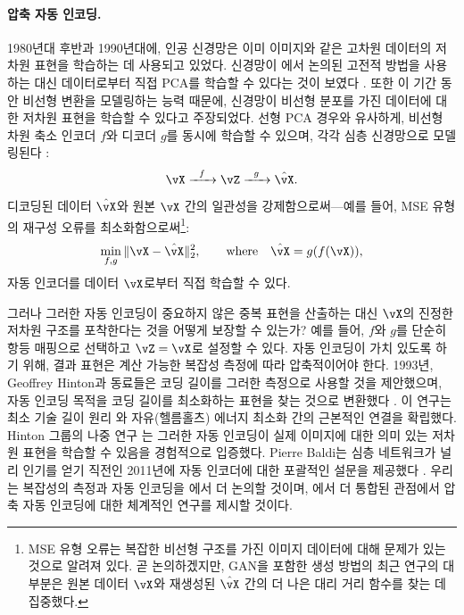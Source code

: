 \documentclass[../../book-main_ko.tex]{subfiles}
\begin{document}
\paragraph{압축 자동 인코딩.}
1980년대 후반과 1990년대에, 인공 신경망은 이미 이미지와 같은 고차원 데이터의 저차원 표현을 학습하는 데 사용되고 있었다. 신경망이 에서 논의된 고전적 방법을 사용하는 대신 데이터로부터 직접 PCA를 학습할 수 있다는 것이 보였다 \cite{Oja1982SimplifiedNM,Baldi89}. 또한 이 기간 동안 비선형 변환을 모델링하는 능력 때문에, 신경망이 비선형 분포를 가진 데이터에 대한 저차원 표현을 학습할 수 있다고 주장되었다. 선형 PCA 경우와 유사하게, 비선형 차원 축소 인코더 \(f\)와 디코더 \(g\)를 동시에 학습할 수 있으며, 각각 심층 신경망으로 모델링된다 \cite{Rumelhart1986,Kramer1991NonlinearPC}:
\begin{equation}
    \vX   \xrightarrow{\hspace{2mm} f \hspace{2mm}} \vZ  \xrightarrow{\hspace{2mm} g \hspace{2mm}} \hat{\vX}.
       \label{eqn:auto-encoding-deep-networks}
\end{equation}
디코딩된 데이터 \(\hat{\vX}\)와 원본 \(\vX\) 간의 일관성을 강제함으로써---예를 들어, MSE 유형의 재구성 오류를 최소화함으로써\footnote{MSE 유형 오류는 복잡한 비선형 구조를 가진 이미지 데이터에 대해 문제가 있는 것으로 알려져 있다. 곧 논의하겠지만, GAN을 포함한 생성 방법의 최근 연구의 대부분은 원본 데이터 \(\vX\)와 재생성된 \(\hat{\vX}\) 간의 더 나은 대리 거리 함수를 찾는 데 집중했다.}:
\begin{equation}
    \min_{f,g} \|\vX - \hat{\vX}\|_{2}^{2}, \qquad \text{where} \quad \hat{\vX} = g(f(\vX)),
\end{equation}
자동 인코더를 데이터 \(\vX\)로부터 직접 학습할 수 있다.

그러나 그러한 자동 인코딩이 중요하지 않은 중복 표현을 산출하는 대신 \(\vX\)의 진정한 저차원 구조를 포착한다는 것을 어떻게 보장할 수 있는가? 예를 들어, \(f\)와 \(g\)를 단순히 항등 매핑으로 선택하고 \(\vZ = \vX\)로 설정할 수 있다. 자동 인코딩이 가치 있도록 하기 위해, 결과 표현은 계산 가능한 복잡성 측정에 따라 압축적이어야 한다. 1993년, Geoffrey Hinton과 동료들은 코딩 길이를 그러한 측정으로 사용할 것을 제안했으며, 자동 인코딩 목적을 코딩 길이를 최소화하는 표현을 찾는 것으로 변환했다 \cite{Hinton-1993}. 이 연구는 최소 기술 길이 원리 \cite{Rissanen-1978}와 자유(헬름홀츠) 에너지 최소화 간의 근본적인 연결을 확립했다. Hinton 그룹의 나중 연구 \cite{Hinton504}는 그러한 자동 인코딩이 실제 이미지에 대한 의미 있는 저차원 표현을 학습할 수 있음을 경험적으로 입증했다. Pierre Baldi는 심층 네트워크가 널리 인기를 얻기 직전인 2011년에 자동 인코더에 대한 포괄적인 설문을 제공했다 \cite{Baldi2011}. 우리는 복잡성의 측정과 자동 인코딩을 에서 더 논의할 것이며, 에서 더 통합된 관점에서 압축 자동 인코딩에 대한 체계적인 연구를 제시할 것이다.
\end{document}
